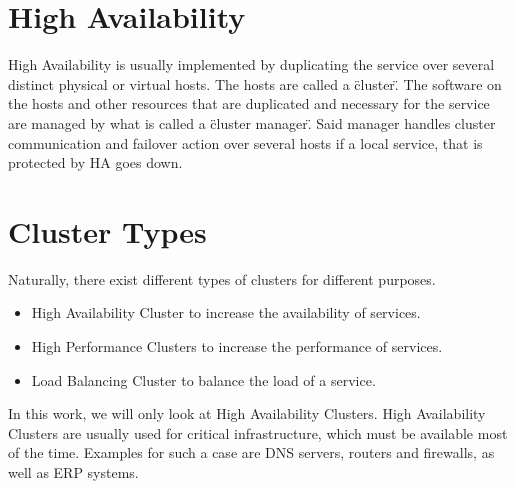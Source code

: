 \section{High Availability}


High Availability is usually implemented by duplicating the service over several distinct physical or
virtual hosts. The hosts are called a \"cluster\". The software on the hosts and other resources
that are duplicated and necessary for the service are managed by what is called a \"cluster manager\".
Said manager handles cluster communication and failover action over several hosts if a local service,
that is protected by \ac{HA} goes down.

\section{Cluster Types}

Naturally, there exist different types of clusters for different purposes.
\begin{itemize}
\item High Availability Cluster to increase the availability of services.
\item High Performance Clusters to increase the performance of services.
\item Load Balancing Cluster to balance the load of a service.
\end{itemize}

In this work, we will only look at High Availability Clusters.
High Availability Clusters are usually used for critical infrastructure,
which must be available most of the time. Examples for such a case are DNS servers,
routers and firewalls, as well as \ac{ERP} systems.
